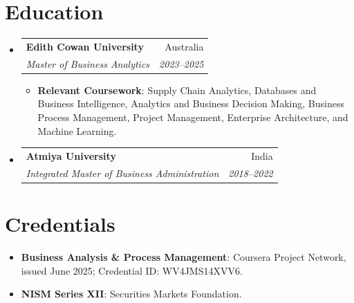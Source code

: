 \documentclass[letterpaper,9.5pt]{article}
\makeatletter
\newcommand{\resumeItem}[2]{
  \item\small{
    \textbf{#1}{: #2 \vspace{-2pt}}
  }
}
\newcommand{\resumeSubheading}[4]{
  \vspace{-1pt}\item
    \begin{tabular*}{0.97\textwidth}{l@{\extracolsep{\fill}}r}
      \textbf{#1} & #2 \\
      \textit{\small #3} & \textit{\small #4} \\
    \end{tabular*}\vspace{-5pt}
}
\newcommand{\resumeSubItem}[2]{\resumeItem{#1}{#2}\vspace{-4pt}}
\newcommand{\resumeSubHeadingListStart}{\begin{itemize}[leftmargin=*]}
\newcommand{\resumeSubHeadingListEnd}{\end{itemize}}
\newcommand{\resumeItemListStart}{\begin{itemize}}
\newcommand{\resumeItemListEnd}{\end{itemize}\vspace{-5pt}}
\makeatother
\begin{document}
\section{Education}
\resumeSubHeadingListStart
  \resumeSubheading
    {Edith Cowan University}{Australia}
    {Master of Business Analytics}{2023--2025}
    \resumeItemListStart
      \resumeItem{Relevant Coursework}
        {Supply Chain Analytics, Databases and Business Intelligence, Analytics and Business Decision Making, Business Process Management, Project Management, Enterprise Architecture, and Machine Learning.}
    \resumeItemListEnd
  \resumeSubheading
    {Atmiya University}{India}
    {Integrated Master of Business Administration}{2018--2022}
\resumeSubHeadingListEnd

\section{Credentials}
\resumeSubHeadingListStart
  \resumeSubItem{Business Analysis \& Process Management}
    {Coursera Project Network, issued June 2025; Credential ID: WV4JMS14XVV6.}
  \resumeSubItem{NISM Series XII}
    {Securities Markets Foundation.}
\resumeSubHeadingListEnd
\end{document}
